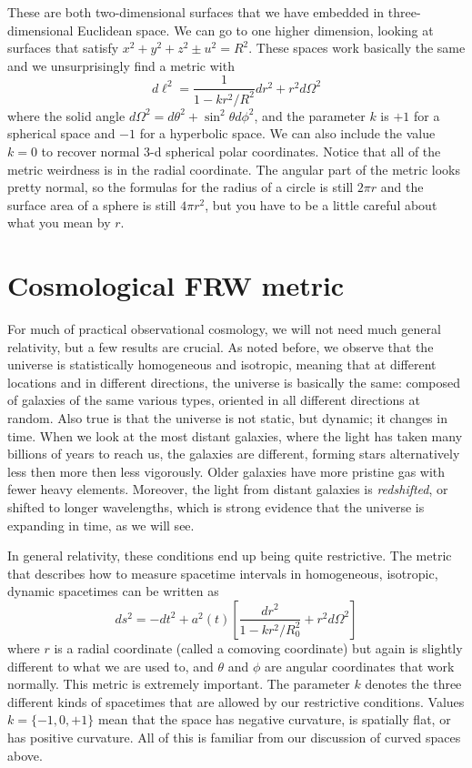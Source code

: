These are both two-dimensional surfaces that we have embedded in three-dimensional Euclidean space.  We can go to one higher dimension, looking at surfaces that satisfy $x^2 + y^2 + z^2 \pm u^2 = R^2$.  These spaces work basically the same and we unsurprisingly find a metric with
\begin{equation}
  d\ell^2 =  \frac{1}{1-kr^2/R^2} dr^2 + r^2 d\Omega^2
\end{equation}
where the solid angle $d\Omega^2 = d\theta^2 + \sin^2 \theta d\phi^2$, and the parameter $k$ is $+1$ for a spherical space and $-1$ for a hyperbolic space.  We can also include the value $k=0$ to recover normal 3-d spherical polar coordinates.  Notice that all of the metric weirdness is in the radial coordinate.  The angular part of the metric looks pretty normal, so the formulas for the radius of a circle is still $2\pi r$ and the surface area of a sphere is still $4\pi r^2$, but you have to be a little careful about what you mean by $r$.

\section{Cosmological FRW metric}
For much of practical observational cosmology, we will not need much general relativity, but a few results are crucial.  As noted before, we observe that the universe is statistically homogeneous and isotropic, meaning that at different locations and in different directions, the universe is basically the same: composed of galaxies of the same various types, oriented in all different directions at random.  Also true is that the universe is not static, but dynamic; it changes in time.  When we look at the most distant galaxies, where the light has taken many billions of years to reach us, the galaxies are different, forming stars alternatively less then more then less vigorously.  Older galaxies have more pristine gas with fewer heavy elements.  Moreover, the light from distant galaxies is \textit{redshifted}, or shifted to longer wavelengths, which is strong evidence that the universe is expanding in time, as we will see.

In general relativity, these conditions end up being quite restrictive.  The metric that describes how to measure spacetime intervals in homogeneous, isotropic, dynamic spacetimes can be written as
\begin{equation}
  ds^2 = -dt^2 + a^2(t)\left[ \frac{dr^2}{1 - kr^2/R_0^2} + r^2 d\Omega^2  \right]
\end{equation}
where $r$ is a radial coordinate (called a comoving coordinate) but again is slightly different to what we are used to, and $\theta$ and $\phi$ are angular coordinates that work normally.  This metric is extremely important.  The parameter $k$ denotes the three different kinds of spacetimes that are allowed by our restrictive conditions.  Values $k = \{ -1, 0, +1 \}$ mean that the space has negative curvature, is spatially flat, or has positive curvature.    All of this is familiar from our discussion of curved spaces above.

